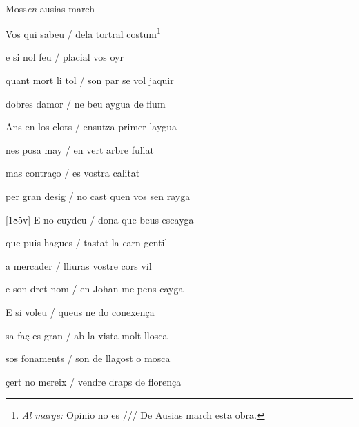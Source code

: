 \documentclass[12pt]{article}
\renewcommand{\espaiAbansEtiquetaPoema}{\vspace{0ex}}
\begin{document}
\begin{estrofa}

\espaiAbansEtiquetaPoema

\\

\begin{rubrica}

Moss\textit{en }ausias march

\end{rubrica}

\end{estrofa}


\begin{estrofa}

 Vos qui sabeu / dela tortral costum\footnote{\textit{Al marge:} Opinio no es ///
De Ausias march esta obra.}

 e si nol feu / placial vos oyr

 quant mort li tol / son par se vol jaquir

 dobres damor / ne beu aygua de flum

 Ans en los clots / ensutza primer laygua

 nes posa may / en vert arbre fullat

 mas contra\c{c}o / es vostra calitat

 per gran desig / no cast quen vos sen rayga

\end{estrofa}



\begin{estrofa}

 [185v] E no cuydeu / dona que beus escayga

 que puis hagues / tastat la carn gentil

 a mercader / lliuras vostre cors vil

 e son dret nom / en Johan me pens cayga

 E si voleu / queus ne do conexen\c{c}a

 sa fa\c{c} es gran / ab la vista molt llosca

 sos fonaments / son de llagost o mosca

 \c{c}ert no mereix / vendre draps de floren\c{c}a

\end{estrofa}
\end{document}
